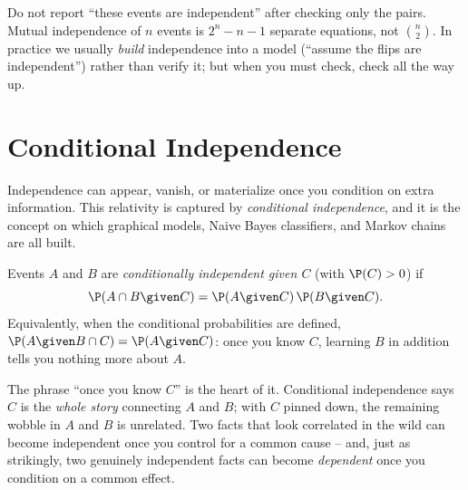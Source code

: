 \begin{trapbox}
Do not report ``these events are independent'' after checking only the pairs. Mutual independence of $n$ events is $2^n - n - 1$ separate equations, not $\binom{n}{2}$. In practice we usually \emph{build} independence into a model (``assume the flips are independent'') rather than verify it; but when you must check, check all the way up.
\end{trapbox}

\section{Conditional Independence}
\label{ch04:cond-indep}

Independence can appear, vanish, or materialize once you condition on extra information. This relativity is captured by \emph{conditional independence}, and it is the concept on which graphical models, Naive Bayes classifiers, and Markov chains are all built.

\begin{definition}
\label{ch04:def-cond-indep}
Events $A$ and $B$ are \emph{conditionally independent given $C$} (with $\P(C) > 0$) if
\[
\P(A \cap B \given C) = \P(A \given C)\,\P(B \given C).
\]
Equivalently, when the conditional probabilities are defined, $\P(A \given B \cap C) = \P(A \given C)$: once you know $C$, learning $B$ in addition tells you nothing more about $A$.
\end{definition}

The phrase ``once you know $C$'' is the heart of it. Conditional independence says $C$ is the \emph{whole story} connecting $A$ and $B$; with $C$ pinned down, the remaining wobble in $A$ and $B$ is unrelated. Two facts that look correlated in the wild can become independent once you control for a common cause -- and, just as strikingly, two genuinely independent facts can become \emph{dependent} once you condition on a common effect.

